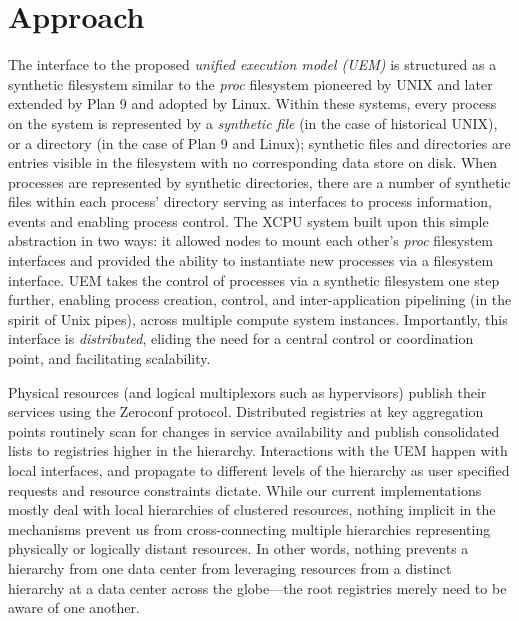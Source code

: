 \documentclass{sig-alternate}
\begin{document}
\section{Approach}
The interface to the proposed {\it unified execution model (UEM)}
is structured as a synthetic filesystem similar to the
\emph{proc} filesystem pioneered by UNIX and later extended by Plan 9 and 
adopted by Linux.  
Within these systems, every process on the system is represented
by a {\it synthetic file} (in the case of historical UNIX), or a directory (in the case of
Plan 9 and Linux); synthetic files and directories are entries visible in the filesystem with no corresponding data store on disk.  When processes are represented by synthetic directories, there are a number of synthetic files 
within each process' directory serving as interfaces to process information, events and enabling process control.
The XCPU system built upon this simple abstraction in two ways: it allowed
nodes to mount each other's \emph{proc} filesystem interfaces and provided the ability
to instantiate new processes via a filesystem interface. 
UEM takes the control of processes via a synthetic filesystem 
one step further, enabling process creation, control, and 
inter-application pipelining (in the spirit of Unix pipes), 
across multiple compute system instances. Importantly, this interface 
is {\it distributed}, eliding the need for a central 
control or coordination point, and facilitating scalability.

Physical resources (and logical multiplexors such as hypervisors) publish
their services using the Zeroconf protocol.  Distributed registries at key
aggregation points routinely scan for changes in service availability and
publish consolidated lists to registries higher in the hierarchy.
Interactions with the UEM happen with local interfaces, and propagate to
different levels of the hierarchy as user specified requests and resource
constraints dictate.  While our current implementations mostly deal with 
local hierarchies of clustered resources, nothing implicit in the mechanisms
prevent us from cross-connecting multiple hierarchies representing physically
or logically distant resources.  In other words, nothing prevents a hierarchy
from one data center from leveraging resources from a distinct hierarchy at
a data center across the globe---the root registries merely need to be aware
of one another.
\end{document}

